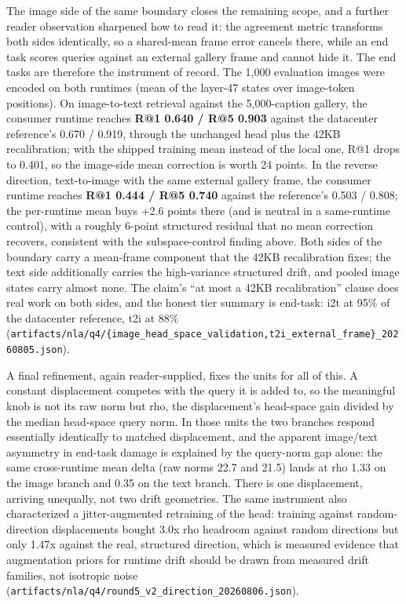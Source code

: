 \documentclass[
  11pt,
]{article}
\newcounter{none} %
\begin{document}
The image side of the same boundary closes the remaining scope, and a
further reader observation sharpened how to read it: the agreement
metric transforms both sides identically, so a shared-mean frame error
cancels there, while an end task scores queries against an external
gallery frame and cannot hide it. The end tasks are therefore the
instrument of record. The 1,000 evaluation images were encoded on both
runtimes (mean of the layer-47 states over image-token positions). On
image-to-text retrieval against the 5,000-caption gallery, the consumer
runtime reaches \textbf{R@1 0.640 / R@5 0.903} against the datacenter
reference's 0.670 / 0.919, through the unchanged head plus the 42KB
recalibration; with the shipped training mean instead of the local one,
R@1 drops to 0.401, so the image-side mean correction is worth 24
points. In the reverse direction, text-to-image with the same external
gallery frame, the consumer runtime reaches \textbf{R@1 0.444 / R@5
0.740} against the reference's 0.503 / 0.808; the per-runtime mean buys
+2.6 points there (and is neutral in a same-runtime control), with a
roughly 6-point structured residual that no mean correction recovers,
consistent with the subspace-control finding above. Both sides of the
boundary carry a mean-frame component that the 42KB recalibration fixes;
the text side additionally carries the high-variance structured drift,
and pooled image states carry almost none. The claim's ``at most a 42KB
recalibration'' clause does real work on both sides, and the honest tier
summary is end-task: i2t at 95\% of the datacenter reference, t2i at
88\%
(\texttt{artifacts/nla/q4/\{image\_head\_space\_validation,t2i\_external\_frame\}\_20260805.json}).

A final refinement, again reader-supplied, fixes the units for all of
this. A constant displacement competes with the query it is added to, so
the meaningful knob is not its raw norm but rho, the displacement's
head-space gain divided by the median head-space query norm. In those
units the two branches respond essentially identically to matched
displacement, and the apparent image/text asymmetry in end-task damage
is explained by the query-norm gap alone: the same cross-runtime mean
delta (raw norms 22.7 and 21.5) lands at rho 1.33 on the image branch
and 0.35 on the text branch. There is one displacement, arriving
unequally, not two drift geometries. The same instrument also
characterized a jitter-augmented retraining of the head: training
against random-direction displacements bought 3.0x rho headroom against
random directions but only 1.47x against the real, structured direction,
which is measured evidence that augmentation priors for runtime drift
should be drawn from measured drift families, not isotropic noise
(\texttt{artifacts/nla/q4/round5\_v2\_direction\_20260806.json}).
\end{document}
